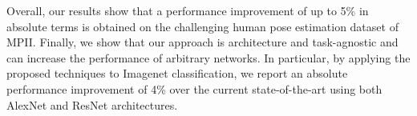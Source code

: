 \documentclass[10pt,twocolumn,letterpaper]{article}
\begin{document}
Overall, our results show that a performance improvement of up to 5\% in absolute terms is obtained on the challenging human pose estimation dataset of MPII. Finally, we show that our approach is architecture and task-agnostic and can increase the performance of arbitrary networks. In particular, by applying the proposed techniques to Imagenet classification, we report an absolute performance improvement of 4\% over the current state-of-the-art using both AlexNet and ResNet architectures. 






    
\end{document}
